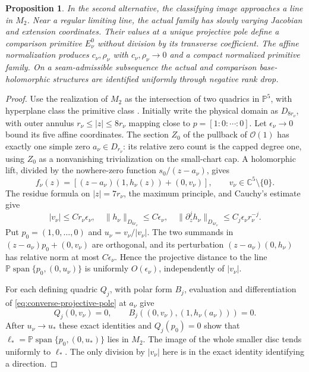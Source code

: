 \documentclass[11pt]{amsart}
\newtheorem{proposition}[theorem]{Proposition}
\theoremstyle{definition}
\theoremstyle{remark}
\theoremstyle{plain}
\newcommand{\CC}{\mathbb{C}}
\newcommand{\PP}{\mathbb{P}}
\begin{document}
\begin{proposition}\label{prop:converse-stable-family}
In the second alternative, the classifying image approaches a line
in $M_2$. Near a regular limiting line, the actual family has slowly
varying Jacobian and extension coordinates. Their values at a
unique projective pole define a comparison primitive
$E_\nu^0$ without division by its transverse coefficient.
The affine normalization produces $c_\nu,\rho_\nu$ with
$c_\nu,\rho_\nu\to0$ and a compact normalized primitive family.
On a seam-admissible subsequence the actual and comparison
base-holomorphic structures are identified uniformly through
negative rank drop.
\end{proposition}

\begin{proof}
Use the realization of $M_2$ as the intersection of two quadrics
in $\PP^5$, with hyperplane class the primitive class
\cite[Example~24]{Munoz99b}. Initially write the physical domain
as $D_{8r_\nu}$, with outer annulus $r_\nu\leq|z|\leq8r_\nu$
mapping close to $p=[1:0:\cdots:0]$. Let $\epsilon_\nu\to0$
bound its five affine coordinates. The section $Z_0$ of the
pullback of $\mathcal O(1)$ has exactly one simple zero
$a_\nu\in D_{r_\nu}$: its relative zero count is the capped
degree one, using $Z_0$ as a nonvanishing trivialization on
the small-chart cap. A holomorphic lift, divided by the
nowhere-zero function $s_0/(z-a_\nu)$, gives
\begin{equation}\label{eq:converse-projective-pole}
 f_\nu(z)=[(z-a_\nu)(1,h_\nu(z))+(0,v_\nu)],
                         \qquad v_\nu\in\CC^5\setminus\{0\}.
\end{equation}
The residue formula on $|z|=7r_\nu$, the maximum principle,
and Cauchy's estimate give
\[
 |v_\nu|\leq Cr_\nu\epsilon_\nu,\quad
 \|h_\nu\|_{D_{6r_\nu}}\leq C\epsilon_\nu,\quad
 \|\partial_z^jh_\nu\|_{D_{4r_\nu}}
                        \leq C_j\epsilon_\nu r_\nu^{-j}.
\]
Put $p_0=(1,0,\ldots,0)$ and $u_\nu=v_\nu/|v_\nu|$.
The two summands in $(z-a_\nu)p_0+(0,v_\nu)$ are orthogonal,
and its perturbation $(z-a_\nu)(0,h_\nu)$ has relative norm
at most $C\epsilon_\nu$. Hence the projective distance to
the line $\PP\operatorname{span}\{p_0,(0,u_\nu)\}$ is uniformly
$O(\epsilon_\nu)$, independently of $|v_\nu|$.

For each defining quadric $Q_j$, with polar form $B_j$,
evaluation and differentiation of \eqref{eq:converse-projective-pole}
at $a_\nu$ give
\[
 Q_j(0,v_\nu)=0,\qquad
 B_j((0,v_\nu),(1,h_\nu(a_\nu)))=0.
\]
After $u_\nu\to u_*$ these exact identities and $Q_j(p_0)=0$
show that $\ell_*=\PP\operatorname{span}\{p_0,(0,u_*)\}$
lies in $M_2$. The image of the whole smaller disc tends
uniformly to $\ell_*$. The only division by $|v_\nu|$ here
is in the exact identity identifying a direction.


\end{proof}
\end{document}
